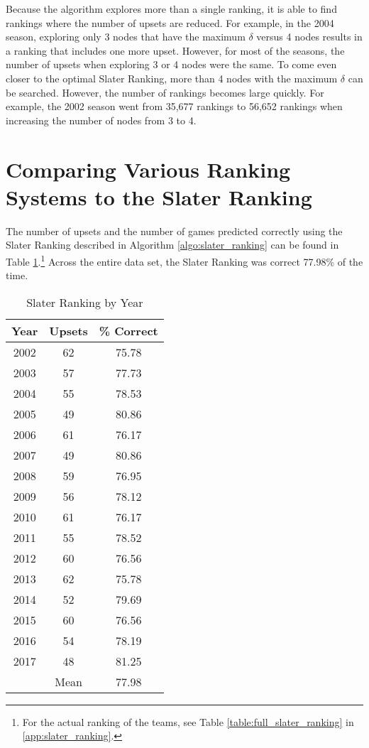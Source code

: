 \documentclass[11pt]{article}
\begin{document}
Because the algorithm explores more than a single ranking, it is able to find rankings where the number of upsets are reduced. For example, in the 2004 season, exploring only 3 nodes that have the maximum $\delta$ versus 4 nodes results in a ranking that includes one more upset. However, for most of the seasons, the number of upsets when exploring 3 or 4 nodes were the same. To come even closer to the optimal Slater Ranking, more than 4 nodes with the maximum $\delta$ can be searched. However, the number of rankings becomes large quickly. For example, the 2002 season went from 35,677 rankings to 56,652 rankings when increasing the number of nodes from 3 to 4.


\section{Comparing Various Ranking Systems to the Slater Ranking}\label{sec:compare}

The number of upsets and the number of games predicted correctly using the Slater Ranking described in Algorithm \ref{algo:slater_ranking} can be found in Table \ref{table:slater_ranking_year}.\footnote{For the actual ranking of the teams, see Table \ref{table:full_slater_ranking} in \ref{app:slater_ranking}.} Across the entire data set, the Slater Ranking was correct 77.98\% of the time.

\begin{table}[!htb]
\begin{center}
\scriptsize
\begin{tabular}{|c|c|c|}
\hline
Year & Upsets & \% Correct\\
\hline
2002 & 62 & 75.78\\
2003 & 57 & 77.73\\
2004 & 55 & 78.53\\
2005 & 49 & 80.86\\
2006 & 61 & 76.17\\
2007 & 49 & 80.86\\
2008 & 59 & 76.95\\
2009 & 56 & 78.12\\
2010 & 61 & 76.17\\
2011 & 55 & 78.52\\
2012 & 60 & 76.56\\
2013 & 62 & 75.78\\
2014 & 52 & 79.69\\
2015 & 60 & 76.56\\
2016 & 54 & 78.19\\
2017 & 48 & 81.25\\
\hline
 & Mean & 77.98\\
\hline
\end{tabular}
\caption{Slater Ranking by Year}\label{table:slater_ranking_year}
\end{center}
\end{table}
\end{document}
